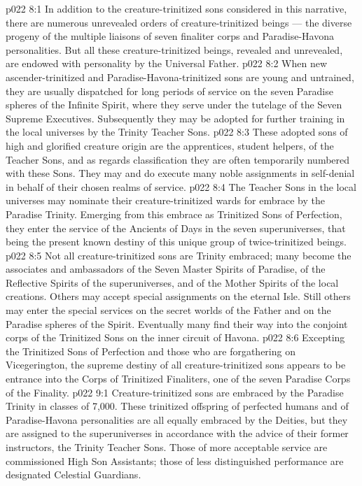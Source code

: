 \vs p022 8:1 In addition to the creature\hyp{}trinitized sons considered in this narrative, there are numerous unrevealed orders of creature\hyp{}trinitized beings --- the diverse progeny of the multiple liaisons of seven finaliter corps and Paradise\hyp{}Havona personalities. But all these creature\hyp{}trinitized beings, revealed and unrevealed, are endowed with personality by the Universal Father.
\vs p022 8:2 \pc When new ascender\hyp{}trinitized and Paradise\hyp{}Havona\hyp{}trinitized sons are young and untrained, they are usually dispatched for long periods of service on the seven Paradise spheres of the Infinite Spirit, where they serve under the tutelage of the Seven Supreme Executives. Subsequently they may be adopted for further training in the local universes by the Trinity Teacher Sons.
\vs p022 8:3 These adopted sons of high and glorified creature origin are the apprentices, student helpers, of the Teacher Sons, and as regards classification they are often temporarily numbered with these Sons. They may and do execute many noble assignments in self\hyp{}denial in behalf of their chosen realms of service.
\vs p022 8:4 The Teacher Sons in the local universes may nominate their creature\hyp{}trinitized wards for embrace by the Paradise Trinity. Emerging from this embrace as Trinitized Sons of Perfection, they enter the service of the Ancients of Days in the seven superuniverses, that being the present known destiny of this unique group of twice\hyp{}trinitized beings.
\vs p022 8:5 Not all creature\hyp{}trinitized sons are Trinity embraced; many become the associates and ambassadors of the Seven Master Spirits of Paradise, of the Reflective Spirits of the superuniverses, and of the Mother Spirits of the local creations. Others may accept special assignments on the eternal Isle. Still others may enter the special services on the secret worlds of the Father and on the Paradise spheres of the Spirit. Eventually many find their way into the conjoint corps of the Trinitized Sons on the inner circuit of Havona.
\vs p022 8:6 Excepting the Trinitized Sons of Perfection and those who are forgathering on Vicegerington, the supreme destiny of all creature\hyp{}trinitized sons appears to be entrance into the Corps of Trinitized Finaliters, one of the seven Paradise Corps of the Finality.
\vs p022 9:1 Creature\hyp{}trinitized sons are embraced by the Paradise Trinity in classes of 7,000. These trinitized offspring of perfected humans and of Paradise\hyp{}Havona personalities are all equally embraced by the Deities, but they are assigned to the superuniverses in accordance with the advice of their former instructors, the Trinity Teacher Sons. Those of more acceptable service are commissioned High Son Assistants; those of less distinguished performance are designated Celestial Guardians.
